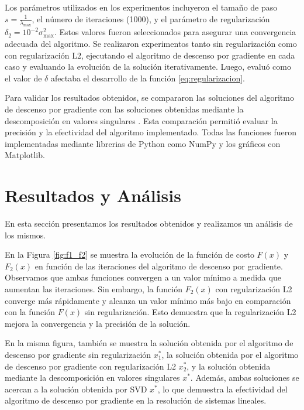 \documentclass[12pt,a4]{article} %
\begin{document}
Los parámetros utilizados en los experimentos incluyeron el tamaño de paso \(s = \frac{1}{\lambda_{\text{max}}}\), el número de iteraciones (1000), y el parámetro de regularización \(\delta_2 = 10^{-2} \sigma_{\text{max}}^2\). Estos valores fueron seleccionados para asegurar una convergencia adecuada del algoritmo. Se realizaron experimentos tanto sin regularización como con regularización L2, ejecutando el algoritmo de descenso por gradiente en cada caso y evaluando la evolución de la solución iterativamente. Luego, evaluó como el valor de $\delta$ afectaba el desarrollo de la función \ref{eq:regularizacion}.

Para validar los resultados obtenidos, se compararon las soluciones del algoritmo de descenso por gradiente con las soluciones obtenidas mediante la descomposición en valores singulares . Esta comparación permitió evaluar la precisión y la efectividad del algoritmo implementado. Todas las funciones fueron implementadas mediante librerias de Python como NumPy y los gráficos con Matplotlib. 



\section{Resultados y Análisis}
En esta sección presentamos los resultados obtenidos y realizamos un análisis de los mismos.

En la Figura \ref{fig:f1_f2} se muestra la evolución de la función de costo \(F(x)\) y \(F_2(x)\) en función de las iteraciones del algoritmo de descenso por gradiente. Observamos que ambas funciones convergen a un valor mínimo a medida que aumentan las iteraciones. Sin embargo, la función \(F_2(x)\) con regularización L2 converge más rápidamente y alcanza un valor mínimo más bajo en comparación con la función \(F(x)\) sin regularización. Esto demuestra que la regularización L2 mejora la convergencia y la precisión de la solución.

En la misma figura, también se muestra la solución obtenida por el algoritmo de descenso por gradiente sin regularización \(x_1^*\), la solución obtenida por el algoritmo de descenso por gradiente con regularización L2 \(x_2^*\), y la solución obtenida mediante la descomposición en valores singulares \(x^*\). Además, ambas soluciones se acercan a la solución obtenida por SVD \(x^*\), lo que demuestra la efectividad del algoritmo de descenso por gradiente en la resolución de sistemas lineales.
\end{document}
